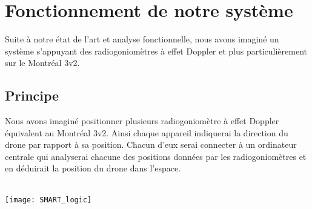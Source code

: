 
\chapter{Fonctionnement de notre système}
\label{chap:fonctionnement}

Suite à notre état de l'art et analyse fonctionnelle, nous avons imaginé un système s'appuyant des radiogoniomètres à effet Doppler et plus particulièrement sur le Montréal 3v2.


\section{Principe}

Nous avons imaginé positionner plusieurs radiogoniomètre à effet Doppler équivalent au Montréal 3v2. Ainsi chaque appareil indiquerai la direction du drone par rapport à sa position. Chacun d'eux serai connecter à un ordinateur centrale qui analyserai chacune des positions données par les radiogoniomètres et en déduirait la position du drone dans l'espace.

~\\

\texttt{[image: SMART\_logic]}







